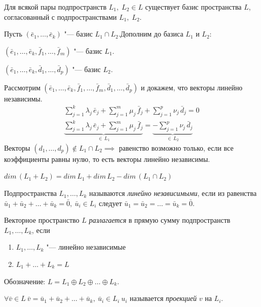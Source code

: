 \begin{theorem}
  Для всякой пары подпространств $L_1,\; L_2 \in L$ существует базис пространства $L$, согласованный с подпространствами $L_1,\;L_2$.
\end{theorem}
\begin{Proof}
  Пусть $(\bar{e}_1, \ldots, \bar{e}_k)$ "--- базис $L_1 \cap L_2$.Дополним до базиса $L_1$ и $L_2$:

  $(\bar{e}_1, \ldots, \bar{e}_k, \bar{f}_1, \ldots, \bar{f}_m)$ "--- базис $L_1$.

  $(\bar{e}_1,\ldots, \bar{e}_k, \bar{d}_1, \ldots, \bar{d}_p)$ "--- базис $L_2$.

  Рассмотрим $(\bar{e}_1, \ldots, \bar{e}_k, \bar{f}_1, \ldots, \bar{f}_m,\bar{d}_1, \ldots, \bar{d}_p)$ и докажем, что векторы линейно независимы.
  \begin{gather*}
    \sum_{j = 1}^{k}\lambda_j \, \bar{e}_j + \sum_{j = 1}^{m} \mu_j \, \bar{f}_j + \sum_{j = 1}^{p} \nu_j \, \bar{d}_j = 0 \\
    \underbrace{\sum_{j = 1}^{k}\lambda_j \, \bar{e}_j + \sum_{j = 1}^{m} \mu_j \, \bar{f}_j}_{\in \, L_1} = \underbrace{-\sum_{j = 1}^{p} \nu_j \, \bar{d}_j}_{\in \, L_2} 
  \end{gather*}
  Векторы $(d_1, \ldots, d_p) \notin L_1 \cap L_2 \implies$ равенство возможно только, если все коэффициенты равны нулю, то есть векторы линейно независимы.
\end{Proof}

\begin{corollary}
  $dim\,(L_1 + L_2) = dim\,L_1 + dim\,L_2 - dim\,(L_1 \cap L_2)$  
\end{corollary}

\begin{definition}
  Подпространства $L_1, \ldots, L_k$ называются \textit{линейно независимыми}, если из равенства $\bar{u}_1 + \bar{u}_2 + 
  \ldots + \bar{u}_k = \bar{0},~ \bar{u}_i \in L_i$ следует $\bar{u}_1 = \bar{u}_2 = \ldots = \bar{u}_k = \bar{0}$. 
\end{definition}

\begin{definition}
  Векторное пространство $L$ \textit{разлагается} в прямую сумму подпространств $L_1, \ldots, L_k$, если 
  \begin{enumerate}
    \item $L_1, \ldots, L_k$ "--- линейно независимые
    \item $L_1 + \ldots + L_k = L$
  \end{enumerate}
  Обозначение: $L = L_1 \oplus L_2 \oplus \ldots \oplus L_k$.
\end{definition}
$\forall \bar{v} \in L ~ \bar{v} = \bar{u}_1 + \bar{u}_2 + \ldots + \bar{u}_k,~ \bar{u}_i \in L_i ~ u_i$ называется \textit{проекцией} $v$ на $L_i$.

